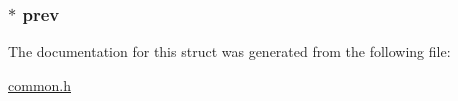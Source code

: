 \subsubsection[{\texorpdfstring{prev}{prev}}]{$\ast$ prev}\hypertarget{struct_interrupt___collection2_ac36f4dac4ba924b695f6253546a9b9ba}{}\label{struct_interrupt___collection2_ac36f4dac4ba924b695f6253546a9b9ba}


The documentation for this struct was generated from the following file\+:\begin{DoxyCompactItemize}
\item 
\hyperlink{common_8h}{common.\+h}\end{DoxyCompactItemize}
